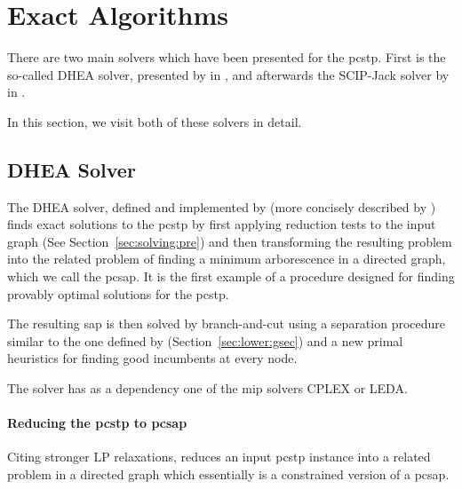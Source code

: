 \clearpage
\section{Exact Algorithms}\label{sec:solving:exact}
There are two main solvers which have been presented for the \gls{pcstp}.
First is the so-called DHEA solver, presented by \citet{ljubic2005solving}
in \citeyear{ljubic2005solving}, and afterwards the SCIP-Jack solver
by \citet{gamrath2017scip} in \citeyear{gamrath2017scip}.

In this section, we visit both of these solvers in detail.
\subsection{DHEA Solver}
\label{sec:exact:dhea}
The DHEA solver, defined and implemented
by \citet{ljubic2005solving}
(more concisely described by \citet{ljubic2006algorithmic}) finds exact solutions to the \gls{pcstp}
by first applying
reduction tests to the input graph (See Section~\ref{sec:solving:pre}) and
then transforming the resulting problem into the related problem of finding a minimum
arborescence in a directed graph, which we call the \gls{pcsap}.
It is the first example of a procedure designed for
finding provably optimal solutions for the \gls{pcstp}.

The resulting \gls{sap} is then solved by branch-and-cut using a separation procedure
similar to the one defined by \citet{lucena2004strong}
(Section~\ref{sec:lower:gsec}) and a new primal heuristics for
finding good incumbents at every node.

The solver has as a dependency one of the \gls{mip} solvers CPLEX or LEDA.
 \paragraph{Reducing the \gls{pcstp} to \gls{pcsap}}
 Citing stronger LP relaxations, \citet{ljubic2005solving} reduces an input \gls{pcstp} instance
 into a related problem in a directed graph which essentially is a constrained version
 of a \gls{pcsap}.


